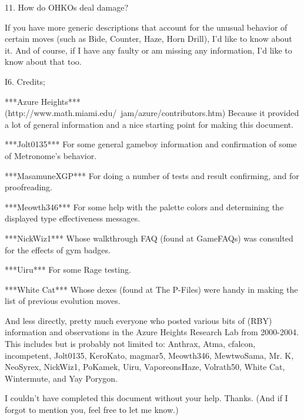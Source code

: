 \documentclass[reprint, aps, prl, paper=A4]{revtex4-1}
\begin{document}
11. How do OHKOs deal damage?


If you have more generic descriptions that account for the unusual behavior of certain moves
(such as Bide, Counter, Haze, Horn Drill), I'd like to know about it. And of course, if I have
any faulty or am missing any information, I'd like to know about that too.


I6. Credits;

***Azure Heights*** (http://www.math.miami.edu/~jam/azure/contributors.htm)
Because it provided a lot of general information and a nice starting point for making this
document.

***Jolt0135***
For some general gameboy information and confirmation of some of Metronome's behavior.

***MasamuneXGP***
For doing a number of tests and result confirming, and for proofreading.

***Meowth346***
For some help with the palette colors and determining the displayed type effectiveness
messages.

***NickWiz1***
Whose walkthrough FAQ (found at GameFAQs) was consulted for the effects of gym badges.

***Uiru***
For some Rage testing.

***White Cat***
Whose dexes (found at The P-Files) were handy in making the list of previous evolution moves.

And less directly, pretty much everyone who posted various bits of (RBY) information and
observations in the Azure Heights Research Lab from 2000-2004. This includes but is probably
not limited to: Anthrax, Atma, cfalcon, incompetent, Jolt0135, KeroKato, magmar5, Meowth346,
MewtwoSama, Mr. K, NeoSyrex, NickWiz1, PoKamek, Uiru, VaporeonsHaze, Volrath50, White Cat,
Wintermute, and Yay Porygon.


I couldn't have completed this document without your help. Thanks. (And if I forgot to mention
you, feel free to let me know.)
\end{document}
